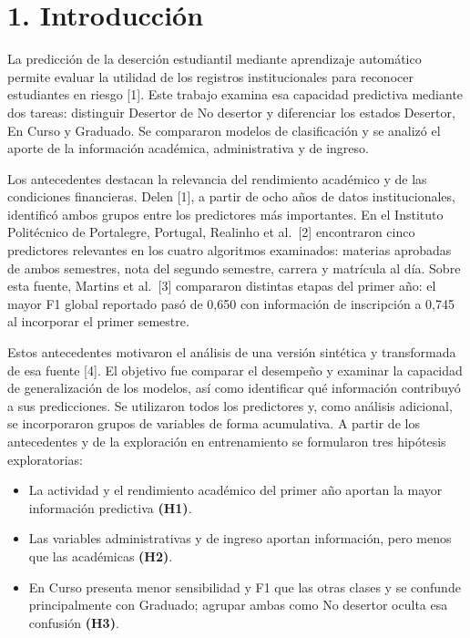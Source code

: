 \documentclass[10pt,a4paper]{article}
\providecommand{\tightlist}{\setlength{\itemsep}{0pt}\setlength{\parskip}{0pt}}
\begin{document}
\hypertarget{introducciuxf3n}{%
\section{1. Introducción}\label{introducciuxf3n}}

La predicción de la deserción estudiantil mediante aprendizaje automático permite evaluar la utilidad de los registros institucionales para reconocer
estudiantes en riesgo {[}1{]}. Este trabajo examina esa capacidad predictiva mediante dos tareas: distinguir Desertor de No desertor y diferenciar los
estados Desertor, En Curso y Graduado. Se compararon modelos de clasificación y se analizó el aporte de la información académica, administrativa y de
ingreso.

Los antecedentes destacan la relevancia del rendimiento académico y de las condiciones financieras. Delen {[}1{]}, a partir de ocho años de datos
institucionales, identificó ambos grupos entre los predictores más importantes. En el Instituto Politécnico de Portalegre, Portugal, Realinho et
al.~{[}2{]} encontraron cinco predictores relevantes en los cuatro algoritmos examinados: materias aprobadas de ambos semestres, nota del segundo
semestre, carrera y matrícula al día. Sobre esta fuente, Martins et al.~{[}3{]} compararon distintas etapas del primer año: el mayor F1 global
reportado pasó de 0,650 con información de inscripción a 0,745 al incorporar el primer semestre.

Estos antecedentes motivaron el análisis de una versión sintética y transformada de esa fuente {[}4{]}. El objetivo fue comparar el desempeño y
examinar la capacidad de generalización de los modelos, así como identificar qué información contribuyó a sus predicciones. Se utilizaron todos los
predictores y, como análisis adicional, se incorporaron grupos de variables de forma acumulativa. A partir de los antecedentes y de la exploración en
entrenamiento se formularon tres hipótesis exploratorias:

\begin{itemize}
\tightlist
\item
  La actividad y el rendimiento académico del primer año aportan la mayor información predictiva \textbf{(H1)}.
\item
  Las variables administrativas y de ingreso aportan información, pero menos que las académicas \textbf{(H2)}.
\item
  En Curso presenta menor sensibilidad y F1 que las otras clases y se confunde principalmente con Graduado; agrupar ambas como No desertor oculta esa
  confusión \textbf{(H3)}.
\end{itemize}
\end{document}
